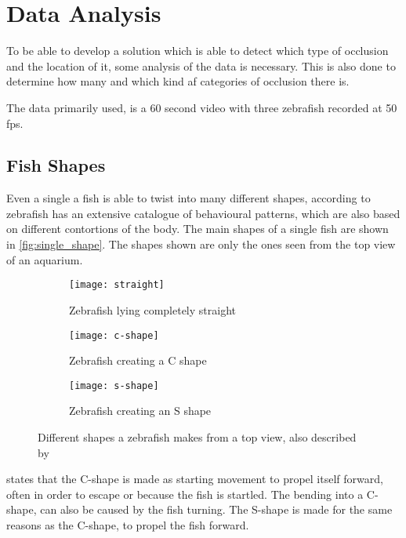 \graphicspath{{figures/analysis/}}
\chapter{Data Analysis}\label{ch:data_anal}
To be able to develop a solution which is able to detect which type of occlusion and the location of it, some analysis of the data is necessary. This is also done to determine how many and which kind af categories of occlusion there is.

The data primarily used, is a 60 second video with three zebrafish recorded at 50 \gls{fps}.

\section{Fish Shapes}
Even a single a fish is able to twist into many different shapes, according to \cite{Kalueff2013} zebrafish has an extensive catalogue of behavioural patterns, which are also based on different contortions of the body. The main shapes of a single fish are shown in \autoref{fig:single_shape}. The shapes shown are only the ones seen from the top view of an aquarium.

\begin{figure}[H]
	\centering
	\begin{subfigure}[b]{0.3\textwidth}
		\texttt{[image: straight]}
		\caption{Zebrafish lying completely straight}
		\label{fig:straight_fish}
	\end{subfigure}
	\begin{subfigure}[b]{0.3\textwidth}
		\texttt{[image: c-shape]}
		\caption{Zebrafish creating a C shape}
		\label{fig:c-shape_fish}
	\end{subfigure}
	\begin{subfigure}[b]{0.3\textwidth}
		\texttt{[image: s-shape]}
		\caption{Zebrafish creating an S shape}
		\label{fig:s-shape_fish}
	\end{subfigure}
\caption{Different shapes a zebrafish makes from a top view, also described by \cite{Kalueff2013}}
\label{fig:single_shape}
\end{figure}

\cite{Kalueff2013} states that the C-shape is made as starting movement to propel itself forward, often in order to escape or because the fish is startled. The bending into a C-shape, can also be caused by the fish turning. The S-shape is made for the same reasons as the C-shape, to propel the fish forward.\\

